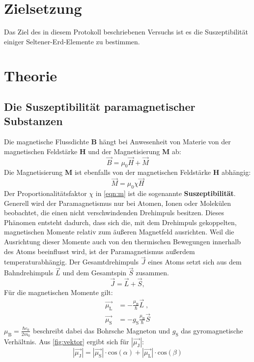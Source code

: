\section*{Zielsetzung}
\label{sec:Zielsetzung}
Das Ziel des in diesem Protokoll beschriebenen Versuchs ist es die Suszeptibilität einiger Seltener-Erd-Elemente zu bestimmen.
\section{Theorie}
\label{sec:Theorie}
\subsection{Die Suszeptibilität paramagnetischer Substanzen}
Die magnetische Flussdichte $\symbf{B}$ hängt bei Anwesenheit von Materie von der magnetischen Feldstärke $\symbf{H}$ und der Magnetisierung $\symbf{M}$ ab:
    \begin{equation}
        \vec B = \mu_0 \vec H + \vec M
    \label{eqn:b}
    \end{equation}
Die Magnetisierung $\symbf{M}$ ist ebenfalls von der magnetischen Feldstärke $\symbf{H}$ abhängig:
\begin{equation}
    \label{eqn:m}
    \vec M = \mu_0 \chi \vec H 
\end{equation} 
Der Proportionalitätsfaktor $\chi$ in \autoref{eqn:m} ist die sogenannte \textbf{Suszeptibilität}.
Generell wird der Paramagnetismus nur bei Atomen, Ionen oder Molekülen beobachtet, die einen nicht verschwindenden Drehimpuls besitzen. Dieses Phänomen entsteht dadurch, dass sich die, mit dem Drehimpuls gekoppelten, magnetischen Momente relativ zum äußeren Magnetfeld ausrichten. Weil die Ausrichtung dieser Momente auch von den thermischen Bewegungen innerhalb des Atoms beeinflusst wird, ist der Paramagnetismus außerdem temperaturabhängig.  
Der Gesamtdrehimpuls $\vec{J}$ eines Atoms setzt sich aus dem Bahndrehimpuls $\vec{L}$ und dem Gesamtspin $\vec{S}$ zusammen.
\begin{equation*}
    \vec{J} = \vec{L} + \vec{S} ,
\end{equation*}
Für die magnetischen Momente gilt: 
\begin{align}
    \vec{\mu_\text{L}} &= - \frac{\mu_\text{B}}{\hbar} \vec{L} \; \text{,} \\
    \vec{\mu_\text{S}} &= - g_\text{S} \frac{\mu_\text{B}}{\hbar} \vec{S}
\end{align}
$\mu_\text{B}=\frac{\hbar e_0}{2m_0} $ beschreibt dabei das Bohrsche Magneton und $g_\text{S}$ das
gyromagnetische Verhältnis.
Aus \autoref{fig:vektor} ergibt sich für $|\vec{\mu_\text{J}}|$:
\begin{equation}
    |\vec{\mu_\text{J}}| = |\vec{\mu_\text{S}}| \cdot \text{cos}\left(\alpha \right) + 
    |\vec{\mu_\text{L}}| \cdot \text{cos}\left(\beta \right)
\end{equation}

